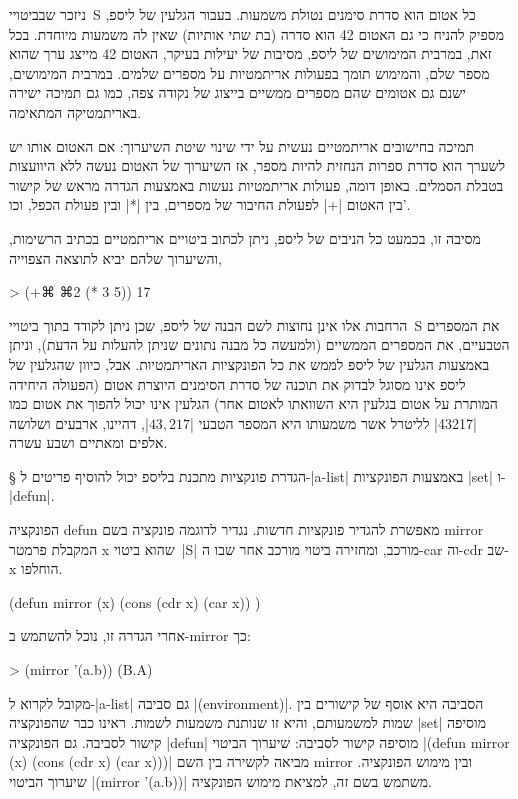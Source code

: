 \documentclass[a4paper,12pt,reqno]{article}
\begin{document}
ניזכר שבביטויי~S כל אטום הוא סדרת סימנים נטולת משמעות. בעבור הגלעין של ליספ,
מספיק להניח כי גם האטום 42 הוא סדרה (בת שתי אותיות) שאין לה משמעות מיוחדת. בכל
זאת, במרבית המימושים של ליספ, מסיבות של יעילות בעיקר, האטום 42 מייצג ערך שהוא
מספר שלם, והמימוש תומך בפעולות אריתמטיות על מספרים שלמים. במרבית המימושים, ישנם
גם אטומים שהם מספרים ממשיים בייצוג של נקודה צפה, כמו גם תמיכה ישירה באריתמטיקה
המתאימה.

תמיכה בחישובים אריתמטיים נעשית על ידי שינוי שיטת השיערוך: אם האטום אותו יש
לשערך הוא סדרת ספרות הנחזית להיות מספר, אז השיערוך של האטום נעשה ללא היוועצות
בטבלת הסמלים. באופן דומה, פעולות אריתמטיות נעשות באמצעות הגדרה מראש של קישור
בין האטום \T|+| לפעולת החיבור של מספרים, בין \T|*| ובין פעולת הכפל, וכו'.

מסיבה זו, בכמעט כל הניבים של ליספ, ניתן לכתוב ביטויים אריתמטיים בכתיב
הרשימות, והשיערוך שלהם יביא לתוצאה הצפוייה,

\begin{LISP}
> (+⌘ ⌘2 (* 3 5))
17
\end{LISP}

הרחבות אלו אינן נחוצות לשם הבנה של ליספ, שכן ניתן לקודד בתוך ביטויי~S את
המספרים הטבעיים, את המספרים הממשיים (ולמעשה כל מבנה נתונים שניתן להעלות על
הדעת), וניתן באמצעות הגלעין של ליספ לממש את כל הפונקציות האריתמטיות. אבל, כיוון
שהגלעין של ליספ אינו מסוגל לבדוק את תוכנה של סדרת הסימנים היוצרת אטום
(הפעולה
היחידה המותרת על אטום בגלעין היא השוואתו לאטום אחר) הגלעין אינו יכול להפוך את
אטום כמו \T|43217| לליטרל אשר משמעותו היא המספר הטבעי \E|$43,217$|,
דהיינו, ארבעים ושלושה אלפים ומאתיים ושבע עשרה.

§ הגדרת פונקציות
מתכנת בליספ יכול להוסיף פריטים ל-\E|a-list| באמצעות הפונקציות \E|set|
ו-\E|defun|.

הפונקציה defun מאפשרת להגדיר פונקציות חדשות. נגדיר לדוגמה פונקציה בשם mirror
המקבלת פרמטר x שהוא ביטוי~\E|S| מורכב, ומחזירה ביטוי מורכב אחר שבו ה-car וה-cdr
שב-x הוחלפו.
\begin{LISP}
(defun
  mirror (x)
  (cons (cdr x) (car x))
)
\end{LISP}
אחרי הגדרה זו, נוכל להשתמש ב-mirror כך:
\begin{LISP}
> (mirror '(a.b))
(B.A)
\end{LISP}

מקובל לקרוא ל-\E|a-list| גם סביבה \E|(environment)|. הסביבה היא אוסף של קישורים
בין שמות למשמעותם, והיא זו שנותנת משמעות לשמות. ראינו כבר שהפונקציה \E|set|
מוסיפה קישור לסביבה. גם הפונקציה \E|defun| מוסיפה קישור לסביבה: שיערוך הביטוי
\T|(defun mirror (x) (cons (cdr x) (car x)))| מביאה לקשירה בין השם mirror ובין
מימוש הפונקציה. שיערוך הביטוי \T|(mirror '(a.b))| משתמש בשם זה, למציאת
מימוש הפונקציה.
\end{document}

